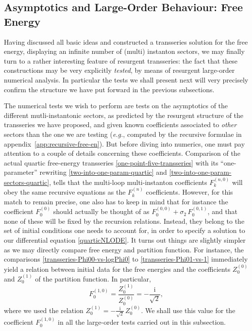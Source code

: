 \documentclass[11pt,a4paper]{article}
\newcommand{\be}{\begin{equation}}
\newcommand{\ee}{\end{equation}}
\newcommand{\rmi}{{\mathrm{i}}}
\begin{document}
\subsection{Asymptotics and Large-Order Behaviour: Free Energy}\label{sec:large-order-F}

Having discussed all basic ideas and constructed a transseries solution for the free energy, displaying an infinite number of (multi) instanton sectors, we may finally turn to a rather interesting feature of resurgent transseries: the fact that these constructions may be very explicitly \textit{tested}, by means of resurgent large-order numerical analysis. In particular the tests we shall present next will very precisely confirm the structure we have put forward in the previous subsections.

The numerical tests we wish to perform are tests on the asymptotics of the different mutli-instantonic sectors, as predicted by the resurgent structure of the transseries we have proposed, and given known coefficients associated to \textit{other} sectors than the one we are testing (\textit{e.g.}, computed by the recursive formulae in appendix~\ref{app:recursive-free-en}). But before diving into numerics, one must pay attention to a couple of details concerning these coefficients. Comparison of the actual quartic free-energy transseries \eqref{one-point-five-transseries} with its ``one-parameter'' rewriting \eqref{two-into-one-param-quartic} and \eqref{two-into-one-param-sectors-quartic}, tells that the multi-loop multi-instanton coefficients $F_k^{(n,0)}$ will obey the same recursive equations as the $F_k^{(n)}$ coefficients. However, for this match to remain precise, one also has to keep in mind that for instance the coefficient $F_0^{(0)}$ should actually be thought of as $F_0^{(0,0)} + \sigma_2\, F_0^{(0,1)}$, and that none of these will be fixed by the recursion relations. Instead, they belong to the set of initial conditions one needs to account for, in order to specify a solution to our differential equation \eqref{quarticNLODE}. It turns out things are slightly simpler as we may directly compare free energy and partition function. For instance, the comparisons \eqref{transseries-Phi00-vs-logPhi0} to \eqref{transseries-Phi01-vs-1} immediately yield a relation between initial data for the free energies and the coefficients $Z_{0}^{(0)}$ and $Z_{0}^{(1)}$ of the partition function. In particular,
%
\be
F_0^{(1,0)} = \frac{Z_0^{(1)}}{Z_0^{(0)}} = -\frac{\rmi}{\sqrt{2}},
\ee
%
\noindent
where we used the relation $Z_0^{(1)} = -\frac{\rmi}{\sqrt{2}}\, Z_0^{(0)}$. We shall use this value for the coefficient $F_0^{(1,0)}$ in all the large-order tests carried out in this subsection.
\end{document}
